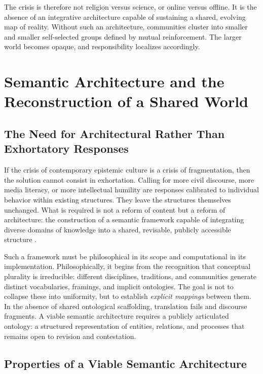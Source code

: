 \documentclass[12pt]{article}
\begin{document}
The crisis is therefore not religion versus science, or online versus offline. It is the absence of an integrative architecture capable of sustaining a shared, evolving map of reality. Without such an architecture, communities cluster into smaller and smaller self-selected groups defined by mutual reinforcement. The larger world becomes opaque, and responsibility localizes accordingly.

\section{Semantic Architecture and the Reconstruction of a Shared World}
\label{sec:architecture}

\subsection{The Need for Architectural Rather Than Exhortatory Responses}

If the crisis of contemporary epistemic culture is a crisis of fragmentation, then the solution cannot consist in exhortation. Calling for more civil discourse, more media literacy, or more intellectual humility are responses calibrated to individual behavior within existing structures. They leave the structures themselves unchanged. What is required is not a reform of content but a reform of architecture: the construction of a semantic framework capable of integrating diverse domains of knowledge into a shared, revisable, publicly accessible structure \citep{Berners-Lee2001}.

Such a framework must be philosophical in its scope and computational in its implementation. Philosophically, it begins from the recognition that conceptual plurality is irreducible: different disciplines, traditions, and communities generate distinct vocabularies, framings, and implicit ontologies. The goal is not to collapse these into uniformity, but to establish \emph{explicit mappings} between them. In the absence of shared ontological scaffolding, translation fails and discourse fragments. A viable semantic architecture requires a publicly articulated ontology: a structured representation of entities, relations, and processes that remains open to revision and contestation.

\subsection{Properties of a Viable Semantic Architecture}
\end{document}
